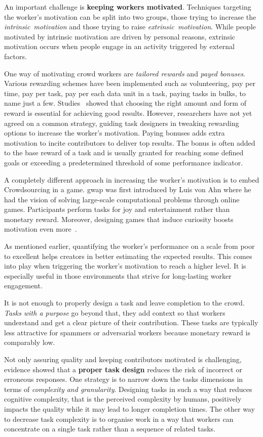 An important challenge is \textbf{keeping workers motivated}. Techniques targeting the worker's motivation can be split into two groups, those trying to increase the \emph{intrinsic~motivation} and those trying to raise \emph{extrinsic~motivation}. While people motivated by intrinsic motivation are driven by personal reasons, extrinsic motivation occurs when people engage in an activity triggered by external factors. 

One way of motivating crowd workers are \textit{tailored rewards} and \textit{payed bonuses}. Various rewarding schemes have been implemented such as volunteering, pay per time, pay per task, pay per each data unit in a task, paying tasks in bulks, to name just a few. Studies~\cite{faradani2011, ho2015} showed that choosing the right amount and form of reward is essential for achieving good results. However, researchers have not yet agreed on a common strategy, guiding task designers in tweaking rewarding options to increase the worker's motivation. 
Paying bonuses adds extra motivation to incite contributors to deliver top results. The bonus is often added to the base reward of a task and is usually granted for reaching some defined goals or exceeding a predetermined threshold of some performance indicator. 

A completely different approach in increasing the worker's motivation is to embed Crowdsourcing in a game. \gls{gwap} was first introduced by Luis von Ahn\cite{ahn2006} where he had the vision of solving large-scale computational problems through online games. Participants perform tasks for joy and entertainment rather than monetary reward. Moreover, designing games that induce curiosity boosts motivation even more~\cite{law2016}. 

As mentioned earlier, quantifying the worker's performance on a scale from poor to excellent helps creators in better estimating the expected results. This comes into play when triggering the worker's motivation to reach a higher level. It is especially useful in those environments that strive for long-lasting worker engagement. 

It is not enough to properly design a task and leave completion to the crowd. \emph{Tasks with a purpose} go beyond that, they add context so that workers understand and get a clear picture of their contribution. These tasks are typically less attractive for spammers or adversarial workers because monetary reward is comparably low. 

Not only assuring quality and keeping contributors motivated is challenging, evidence showed that a \textbf{proper task design} reduces the risk of incorrect or erroneous responses. One strategy is to narrow down the tasks dimensions in terms of \emph{complexity and granularity}. Designing tasks in such a way that reduces cognitive complexity, that is the perceived complexity by humans, positively impacts the quality while it may lead to longer completion times. The other way to decrease task complexity is to organise work in a way that workers can concentrate on a single task rather than a sequence of related tasks.  

